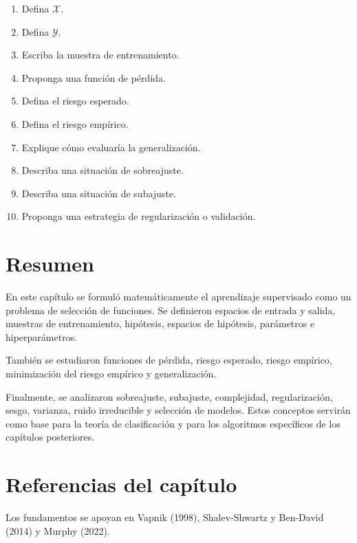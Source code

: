 \documentclass[
  spanish,
  10.5pt,
  letterpaper,
  DIV=11,
  numbers=noendperiod,
  oneside,
  open=any]{scrreprt}
\providecommand{\tightlist}{%
  \setlength{\itemsep}{0pt}\setlength{\parskip}{0pt}}
\theoremstyle{definition}
\theoremstyle{definition}
\theoremstyle{plain}
\theoremstyle{remark}
\begin{document}
\begin{enumerate}
\def\labelenumi{\arabic{enumi}.}
\tightlist
\item
  Defina \(\mathcal{X}\).
\item
  Defina \(\mathcal{Y}\).
\item
  Escriba la muestra de entrenamiento.
\item
  Proponga una función de pérdida.
\item
  Defina el riesgo esperado.
\item
  Defina el riesgo empírico.
\item
  Explique cómo evaluaría la generalización.
\item
  Describa una situación de sobreajuste.
\item
  Describa una situación de subajuste.
\item
  Proponga una estrategia de regularización o validación.
\end{enumerate}

\section*{Resumen}\label{resumen-4}


En este capítulo se formuló matemáticamente el aprendizaje supervisado
como un problema de selección de funciones. Se definieron espacios de
entrada y salida, muestras de entrenamiento, hipótesis, espacios de
hipótesis, parámetros e hiperparámetros.

También se estudiaron funciones de pérdida, riesgo esperado, riesgo
empírico, minimización del riesgo empírico y generalización.

Finalmente, se analizaron sobreajuste, subajuste, complejidad,
regularización, sesgo, varianza, ruido irreducible y selección de
modelos. Estos conceptos servirán como base para la teoría de
clasificación y para los algoritmos específicos de los capítulos
posteriores.

\section*{Referencias del capítulo}\label{referencias-del-capuxedtulo-4}


Los fundamentos se apoyan en Vapnik (1998), Shalev-Shwartz y Ben-David
(2014) y Murphy (2022).
\end{document}
